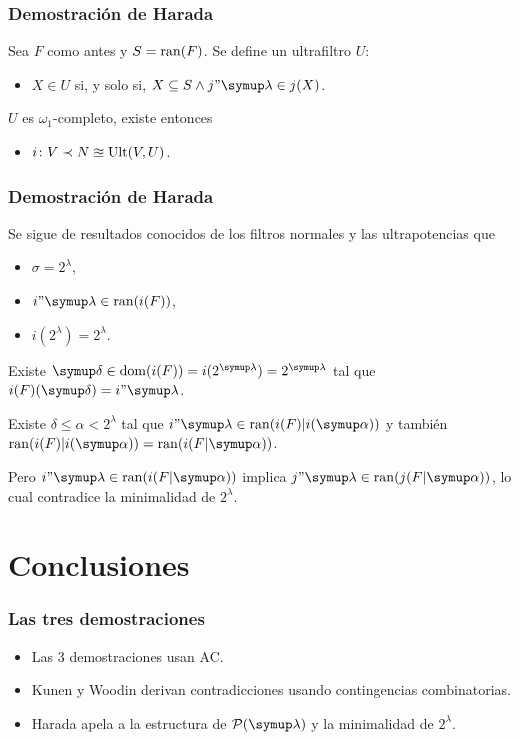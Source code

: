 \documentclass{beamer}
\begin{document}
\begin{frame}
    \frametitle{Demostración de Harada}

    Sea $F$ como antes y $S=\operatorname{ran}(F)$. Se define un ultrafiltro $U$:
    \begin{itemize}
        \item $X\in U$ si, y solo si, $X\subseteq S\land j"\lambda\in j(X)$.
    \end{itemize}

    \pause
    $U$ es $\omega_1$-completo, existe entonces
    \begin{itemize}
        \item $i\colon V\prec N\approxeq\operatorname{Ult}(V, U)$.
    \end{itemize}
\end{frame}

\begin{frame}
    \frametitle{Demostración de Harada}

    Se sigue de resultados conocidos de los filtros
    normales y las ultrapotencias que
    \begin{itemize}
        \item $\sigma=2^\lambda$,
        \item $i"\lambda\in\ran(i(F))$,
        \item $i(2^\lambda) = 2^\lambda$.
    \end{itemize}

    \pause
    Existe
    $\delta\in\dom(i(F)) = i(2^\lambda) = 2^\lambda$
    tal que $i(F)(\delta) = i"\lambda$.

    \pause
    Existe $\delta\leq\alpha<2^\lambda$ tal que $i"\lambda\in\ran(i(F)|i(\alpha))$
    y también $\ran(i(F)|i(\alpha)) = \ran(i(F|\alpha))$.

    \pause
    Pero $i"\lambda\in\ran(i(F|\alpha))$
    implica $j"\lambda\in\ran(j(F|\alpha))$, lo cual contradice la minimalidad
    de $2^\lambda$.
\end{frame}

\section{Conclusiones}

\begin{frame}
    \frametitle{Las tres demostraciones}

    \begin{itemize}
        \pause
        \item Las 3 demostraciones usan AC.
        \pause
        \item Kunen y Woodin derivan contradicciones usando contingencias combinatorias.
        \item Harada apela a la estructura de $\pwset{\lambda}$ y
            la minimalidad de $2^\lambda$.
    \end{itemize}
\end{frame}
\end{document}
